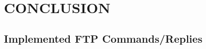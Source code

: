\documentclass[10pt,twocolumn]{witseiepaper}
\begin{document}


\section{CONCLUSION}


%



\newpage
\onecolumn


\begin{appendix}
	
\setcounter{figure}{0} \renewcommand{\thefigure}{A\arabic{figure}}
	
\section{Implemented FTP Commands/Replies} \label{sec:comm-replyTable}


\end{appendix}
\end{document}
